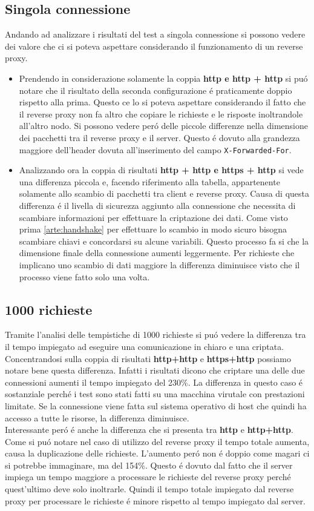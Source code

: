 \subsection{Singola connessione}
Andando ad analizzare i risultati del test a singola connessione si possono vedere dei valore che ci si poteva aspettare considerando il funzionamento di un reverse proxy.
\begin{itemize}
  \item Prendendo in considerazione solamente la coppia \textbf{http e http + http} si puó notare che il risultato della seconda configurazione é praticamente doppio rispetto alla prima. Questo ce lo si poteva aspettare considerando il fatto che il reverse proxy non fa altro che copiare le richieste e le risposte inoltrandole all'altro nodo. Si possono vedere peró delle piccole differenze nella dimensione dei pacchetti tra il reverse proxy e il server. Questo é dovuto alla grandezza maggiore dell'header dovuta all'inserimento del campo \texttt{X-Forwarded-For}.
  \item Analizzando ora la coppia di risultati \textbf{http + http e https + http} si vede una differenza piccola e, facendo riferimento alla tabella, appartenente solamente allo scambio di pacchetti tra client e reverse proxy. Causa di questa differenza é il livella di sicurezza aggiunto alla connessione che necessita di scambiare informazioni per effettuare la criptazione dei dati. Come visto prima \ref{arte:handshake} per effettuare lo scambio in modo sicuro bisogna scambiare chiavi e concordarsi su alcune variabili. Questo processo fa si che la dimensione finale della connessione aumenti leggermente. Per richieste che implicano uno scambio di dati maggiore la differenza diminuisce visto che il processo viene fatto solo una volta.
\end{itemize}

\subsection{1000 richieste}
Tramite l'analisi delle tempistiche di 1000 richieste si puó vedere la differenza tra il tempo impiegato ad eseguire una comunicazione in chiaro e una criptata. Concentrandosi sulla coppia di risultati \textbf{http+http} e \textbf{https+http} possiamo notare bene questa differenza. Infatti i risultati dicono che criptare una delle due connessioni aumenti il tempo impiegato del 230\%. La differenza in questo caso é sostanziale perché i test sono stati fatti su una macchina virutale con prestazioni limitate. Se la connessione viene fatta sul sistema operativo di host che quindi ha accesso a tutte le risorse, la differenza diminuisce.\\
Interessante peró é anche la differenza che si presenta tra \textbf{http} e \textbf{http+http}. Come si puó notare nel caso di utilizzo del reverse proxy il tempo totale aumenta, causa la duplicazione delle richieste. L'aumento peró non é doppio come magari ci si potrebbe immaginare, ma del 154\%. Questo é dovuto dal fatto che il server impiega un tempo maggiore a processare le richieste del reverse proxy perché quest'ultimo deve solo inoltrarle. Quindi il tempo totale impiegato dal reverse proxy per processare le richieste é minore rispetto al tempo impiegato dal server.
